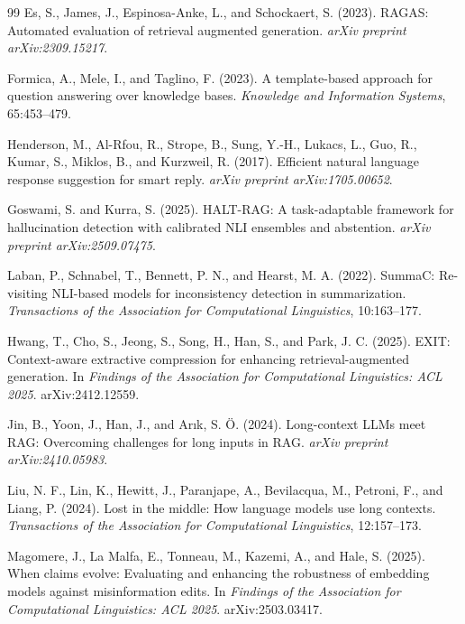 \documentclass[a4paper,twoside]{article}
\begin{document}
{\begin{thebibliography}{99}
 Es, S., James, J., Espinosa-Anke, L., and Schockaert, S. (2023). RAGAS: Automated evaluation of retrieval augmented generation. \textit{arXiv preprint arXiv:2309.15217}.

 Formica, A., Mele, I., and Taglino, F. (2023). A template-based approach for question answering over knowledge bases. \textit{Knowledge and Information Systems}, 65:453--479.

 Henderson, M., Al-Rfou, R., Strope, B., Sung, Y.-H., Lukacs, L., Guo, R., Kumar, S., Miklos, B., and Kurzweil, R. (2017). Efficient natural language response suggestion for smart reply. \textit{arXiv preprint arXiv:1705.00652}.

 Goswami, S. and Kurra, S. (2025). HALT-RAG: A task-adaptable framework for hallucination detection with calibrated NLI ensembles and abstention. \textit{arXiv preprint arXiv:2509.07475}.

 Laban, P., Schnabel, T., Bennett, P. N., and Hearst, M. A. (2022). SummaC: Re-visiting NLI-based models for inconsistency detection in summarization. \textit{Transactions of the Association for Computational Linguistics}, 10:163--177.

 Hwang, T., Cho, S., Jeong, S., Song, H., Han, S., and Park, J. C. (2025). EXIT: Context-aware extractive compression for enhancing retrieval-augmented generation. In \textit{Findings of the Association for Computational Linguistics: ACL 2025}. arXiv:2412.12559.

 Jin, B., Yoon, J., Han, J., and Arık, S. Ö. (2024). Long-context LLMs meet RAG: Overcoming challenges for long inputs in RAG. \textit{arXiv preprint arXiv:2410.05983}.

 Liu, N. F., Lin, K., Hewitt, J., Paranjape, A., Bevilacqua, M., Petroni, F., and Liang, P. (2024). Lost in the middle: How language models use long contexts. \textit{Transactions of the Association for Computational Linguistics}, 12:157--173.

 Magomere, J., La Malfa, E., Tonneau, M., Kazemi, A., and Hale, S. (2025). When claims evolve: Evaluating and enhancing the robustness of embedding models against misinformation edits. In \textit{Findings of the Association for Computational Linguistics: ACL 2025}. arXiv:2503.03417.


\end{thebibliography}}
\end{document}
